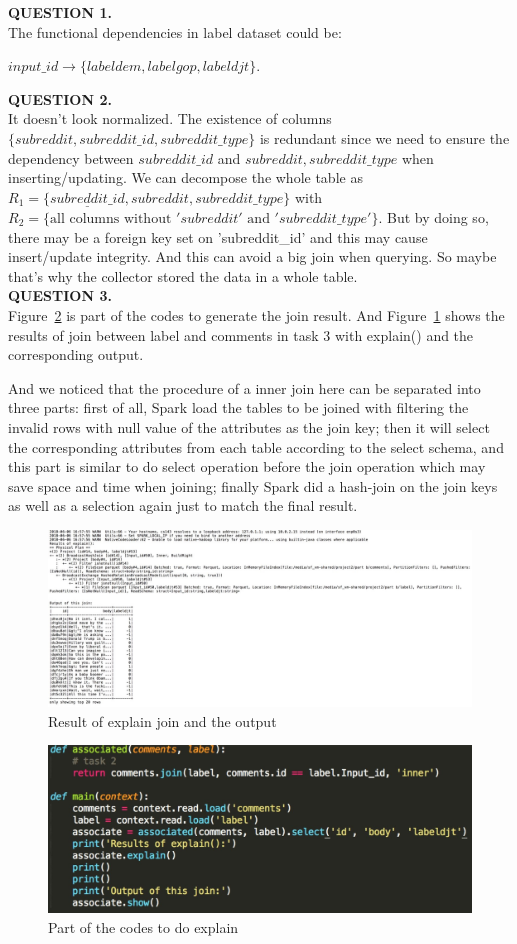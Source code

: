 \documentclass{article}
\begin{document}
\textbf{QUESTION 1.}\\

The functional dependencies in label dataset could be:
\begin{center}
$input\_id \rightarrow \{labeldem, labelgop, labeldjt\}$.
\end{center}
\hfill

\textbf{QUESTION 2.}\\

It doesn't look normalized. The existence of columns $\{subreddit, subreddit\_id, subreddit\_type\}$ is redundant since we need to ensure the dependency between $subreddit\_id$ and $subreddit, subreddit\_type$ when inserting/updating. We can decompose the whole table as $R_1 = \{\underline{subreddit\_id}, subreddit, subreddit\_type\}$ with $R_2 = \{\text{all columns without }'subreddit'\text{ and }'subreddit\_type' \}$. But by doing so, there may be a foreign key set on 'subreddit\_id' and this may cause insert/update integrity. And this can avoid a big join when querying. So maybe that's why the collector stored the data in a whole table.\\

\textbf{QUESTION 3.}\\

Figure~\ref{q32} is part of the codes to generate the join result. And Figure~\ref{q31} shows the results of join between label and comments in task 3 with explain() and the corresponding output. 

And we noticed that the procedure of a inner join here can be separated into three parts: first of all, Spark load the tables to be joined with filtering the invalid rows with null value of the attributes as the join key; then it will select the corresponding attributes from each table according to the select schema, and this part is similar to do select operation before the join operation which may save space and time when joining; finally Spark did a hash-join on the join keys as well as a selection again just to match the final result.
\begin{figure}[H]
\centering
\includegraphics[width=\textwidth]{q3-1.jpg}
\caption{Result of explain join and the output}\label{q31}
\end{figure}

\begin{figure}[H]
\centering
\includegraphics[width=\textwidth]{q3-2.jpg}
\caption{Part of the codes to do explain}\label{q32}
\end{figure}
\end{document}
